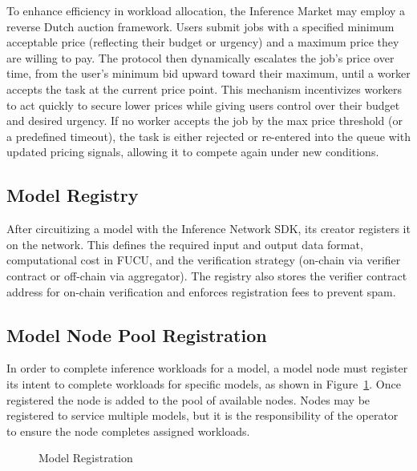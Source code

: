 \documentclass[conference]{IEEEtran}
\begin{document}
To enhance efficiency in workload allocation, the Inference Market may employ a reverse Dutch auction framework.
Users submit jobs with a specified minimum acceptable price (reflecting their budget or urgency) and a maximum price they are willing to pay.
The protocol then dynamically escalates the job’s price over time, from the user’s minimum bid upward toward their maximum, until a worker accepts the task at the current price point.
This mechanism incentivizes workers to act quickly to secure lower prices while giving users control over their budget and desired urgency.
If no worker accepts the job by the max price threshold (or a predefined timeout), the task is either rejected or re-entered into the queue with updated pricing signals, allowing it to compete again under new conditions.

\subsection{Model Registry}

After circuitizing a model with the Inference Network SDK, its creator registers it on the network. This defines the required input and output data format, computational cost in FUCU, and the verification strategy (on-chain via verifier contract or off-chain via aggregator). The registry also stores the verifier contract address for on-chain verification and enforces registration fees to prevent spam.

\subsection{Model Node Pool Registration}

In order to complete inference workloads for a model, a model node must register its intent to complete workloads for specific models, as shown in Figure~\ref{fig:Fig 3}. Once registered the node is added to the pool of available nodes. Nodes may be registered to service multiple models, but it is the responsibility of the operator to ensure the node completes assigned workloads.

\begin{figure}[!ht]
    \centering
{}
    \caption{Model Registration}
    \label{fig:Fig 3}
\end{figure}
\end{document}
